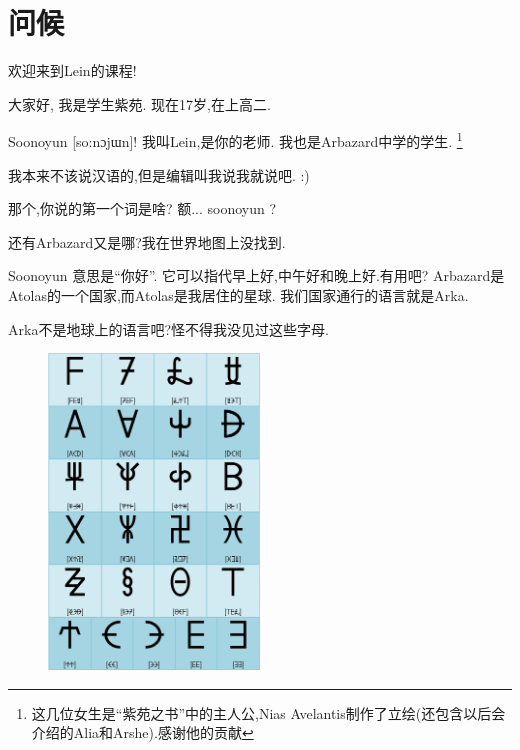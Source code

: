 \chapter[问候]{问候}



欢迎来到Lein的课程!

大家好, 我是学生紫苑. 现在17岁,在上高二.


Soonoyun [so:nɔjɯn]! 我叫Lein,是你的老师. 我也是Arbazard中学的学生.
\footnote{这几位女生是``紫苑之书''中的主人公,Nias Avelantis制作了立绘(还包含以后会介绍的Alia和Arshe).感谢他的贡献}

我本来不该说汉语的,但是编辑叫我说我就说吧. :)


那个,你说的第一个词是啥? 额... soonoyun ?

还有Arbazard又是哪?我在世界地图上没找到.


Soonoyun 意思是``你好''. 它可以指代早上好,中午好和晚上好.有用吧?
Arbazard是Atolas的一个国家,而Atolas是我居住的星球. 我们国家通行的语言就是Arka.


Arka不是地球上的语言吧?怪不得我没见过这些字母.
\begin{figure}[H]
\includegraphics[width=0.5\textwidth]{ARKA/klandi.png}
\end{figure}

